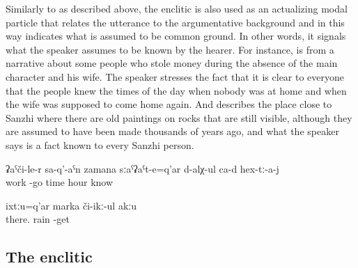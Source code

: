 Similarly to  as described above, the enclitic  is also used as an actualizing modal particle that relates the utterance to the argumentative background and in this way indicates what is assumed to be common ground. In other words, it signals what the speaker assumes to be known by the hearer. For instance,  is from a narrative about some people who stole money during the absence of the main character and his wife. The speaker stresses the fact that it is clear to everyone that the people knew the times of the day when nobody was at home and when the wife was supposed to come home again. And  describes the place close to Sanzhi where there are old paintings on rocks that are still visible, although they are assumed to have been made thousands of years ago, and what the speaker says is a fact known to every Sanzhi person.
%
\begin{exe}
	\ex	\label{ex:‎‎‎They know the time when (the wife) comes back from work minor}
	\gll	ʡaˁči-le-r	sa-q'-aˁn	zamana	sːaˁʡaˁt-e=q'ar	d-alχ-ul ca-d	hex-tː-a-j\\
		work	-go	time	hour	know		\\
	\glt	{}

	\ex	\label{ex:The rain does not reach there minor}
	\gll	ixtːu=q'ar	marka	či-ikː-ul	akːu\\
		there.	rain	-get	\\
	\glt	{}
\end{exe}



\subsection{The enclitic }
\label{ssec:The enclitic =n(u)}

